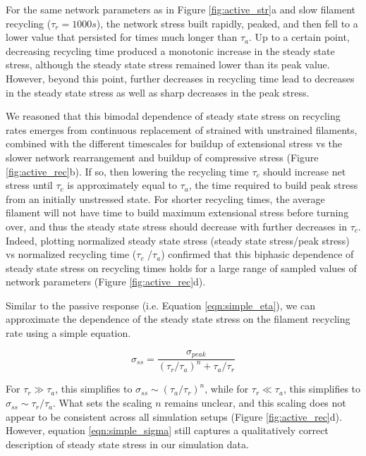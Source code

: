 \documentclass[10pt,letterpaper]{article}
\begin{document}
For the same network parameters as in Figure \ref{fig:active_str}a and slow filament recycling ($\tau_r = 1000 s$), the network stress built rapidly, peaked, and then fell to a lower value that persisted for times much longer than $\tau_a$. Up to a certain point, decreasing recycling time produced a monotonic increase in the steady state stress, although the steady state stress remained lower than its peak value. However, beyond this point, further decreases in recycling time lead to decreases in the steady state stress as well as sharp decreases in the peak stress. 

We reasoned that this bimodal dependence of steady state stress on recycling rates emerges from continuous replacement of strained with unstrained filaments, combined with the different timescales for buildup of extensional stress vs the slower network rearrangement and buildup of compressive  stress (Figure \ref{fig:active_rec}b). If so, then lowering the recycling time $\tau_c$ should increase net stress until $\tau_c$ is approximately equal to $\tau_a$, the time required to build peak stress from an initially unstressed state. For shorter recycling times, the average filament will not have time to build maximum extensional stress before turning over, and thus the steady state stress should decrease with further decreases in $\tau_c$. Indeed, plotting normalized steady state stress (steady state stress/peak stress) vs normalized recycling time ($\tau_c$ /$\tau_a$) confirmed that this biphasic dependence of steady state stress on recycling times holds for a large range of sampled values of network parameters (Figure \ref{fig:active_rec}d).


Similar to the passive response (i.e. Equation \ref{eqn:simple_eta}), we can approximate the dependence of the steady state stress on the filament recycling rate using a simple equation. 

\begin{equation}
\label{eqn:simple_sigma}
\sigma_{ss} = \frac{\sigma_{peak}}{(\tau_r/\tau_a)^n+\tau_a/\tau_r}  
\end{equation}

For $\tau_r\gg\tau_a$, this simplifies to $\sigma_{ss}\sim(\tau_a/\tau_r)^n$, while for $\tau_r\ll\tau_a$, this simplifies to $\sigma_{ss}\sim\tau_r/\tau_a$. What sets the scaling $n$ remains unclear, and this scaling does not appear to be consistent across all simulation setups (Figure \ref{fig:active_rec}d). However, equation \ref{eqn:simple_sigma} still captures a qualitatively correct description of steady state stress in our simulation data.
\end{document}
